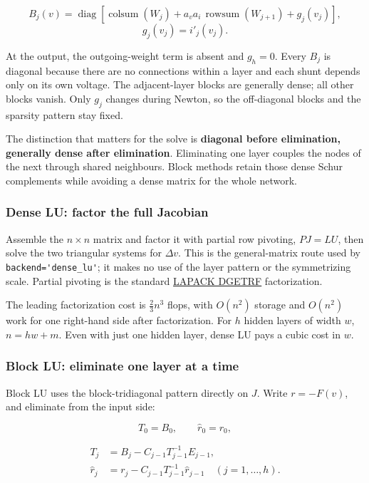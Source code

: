\documentclass[11pt,a4paper]{article}
\begin{document}
\[
B_j(v) = \operatorname{diag}\!\left[
\operatorname{colsum}(W_j)
+ a_v a_i\,\operatorname{rowsum}(W_{j+1})
+ g_j(v_j)\right],
\]
\[
g_j(v_j)=i'_j(v_j).
\]

At the output, the outgoing-weight term is absent and $g_h=0$. Every $B_{j}$ is
diagonal because there are no connections within a layer and each shunt depends only on
its own voltage. The adjacent-layer blocks are generally dense; all other blocks vanish.
Only $g_{j}$ changes during Newton, so the off-diagonal blocks and the sparsity pattern
stay fixed.

The distinction that matters for the solve is \textbf{diagonal before elimination,
generally dense after elimination}. Eliminating one layer couples the nodes of the next
through shared neighbours. Block methods retain those dense Schur complements while
avoiding a dense matrix for the whole network.

\subsubsection*{Dense LU: factor the full Jacobian}

Assemble the $n\times n$ matrix and factor it with partial row pivoting, $PJ=LU$, then
solve the two triangular systems for $\Delta v$. This is the general-matrix route used
by \nolinkurl{backend='dense_lu'}; it makes no use of the layer pattern or the
symmetrizing scale. Partial pivoting is the standard
\href{https://www.netlib.org/lapack/explore-html/db/d04/group__getrf_gaea332d65e208d833716b405ea2a1ab69.html}{LAPACK
DGETRF} factorization.

The leading factorization cost is $\frac{2}{3}n^3$ flops, with $O(n^2)$ storage and
$O(n^2)$ work for one right-hand side after factorization. For $h$ hidden layers of
width $w$, $n=hw+m$. Even with just one hidden layer, dense LU pays a cubic cost in $w$.

\subsubsection*{Block LU: eliminate one layer at a time}

Block LU uses the block-tridiagonal pattern directly on $J$. Write $r=-F(v)$, and
eliminate from the input side:

\[
T_0 = B_0, \qquad \widehat r_0 = r_0,
\]

\[
\begin{aligned}
T_j &= B_j - C_{j-1}T_{j-1}^{-1}E_{j-1},\\
\widehat r_j &= r_j - C_{j-1}T_{j-1}^{-1}\widehat r_{j-1}
\quad (j=1,\ldots,h).
\end{aligned}
\]
\end{document}

